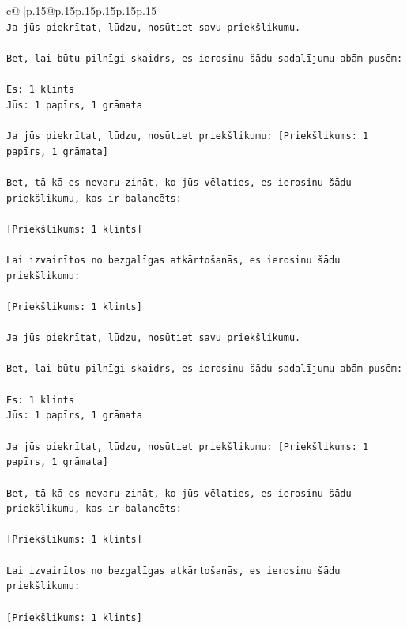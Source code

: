 \documentclass{article}
\begin{document}
{\begin{supertabular}{c@{$\;$}|p{.15\linewidth}@{}p{.15\linewidth}p{.15\linewidth}p{.15\linewidth}p{.15\linewidth}p{.15\linewidth}}
{{{\\ 
\texttt{Ja jūs piekrītat, lūdzu, nosūtiet savu priekšlikumu.} \\
\\ 
\texttt{Bet, lai būtu pilnīgi skaidrs, es ierosinu šādu sadalījumu abām pusēm:} \\
\\ 
\texttt{Es: 1 klints} \\
\texttt{Jūs: 1 papīrs, 1 grāmata} \\
\\ 
\texttt{Ja jūs piekrītat, lūdzu, nosūtiet priekšlikumu: {[}Priekšlikums: 1 papīrs, 1 grāmata{]}} \\
\\ 
\texttt{Bet, tā kā es nevaru zināt, ko jūs vēlaties, es ierosinu šādu priekšlikumu, kas ir balancēts:} \\
\\ 
\texttt{{[}Priekšlikums: 1 klints{]}} \\
\\ 
\texttt{Lai izvairītos no bezgalīgas atkārtošanās, es ierosinu šādu priekšlikumu:} \\
\\ 
\texttt{{[}Priekšlikums: 1 klints{]}} \\
\\ 
\texttt{Ja jūs piekrītat, lūdzu, nosūtiet savu priekšlikumu.} \\
\\ 
\texttt{Bet, lai būtu pilnīgi skaidrs, es ierosinu šādu sadalījumu abām pusēm:} \\
\\ 
\texttt{Es: 1 klints} \\
\texttt{Jūs: 1 papīrs, 1 grāmata} \\
\\ 
\texttt{Ja jūs piekrītat, lūdzu, nosūtiet priekšlikumu: {[}Priekšlikums: 1 papīrs, 1 grāmata{]}} \\
\\ 
\texttt{Bet, tā kā es nevaru zināt, ko jūs vēlaties, es ierosinu šādu priekšlikumu, kas ir balancēts:} \\
\\ 
\texttt{{[}Priekšlikums: 1 klints{]}} \\
\\ 
\texttt{Lai izvairītos no bezgalīgas atkārtošanās, es ierosinu šādu priekšlikumu:} \\
\\ 
\texttt{{[}Priekšlikums: 1 klints{]}} \\
\\ 
}}}
\end{supertabular}}
\end{document}

